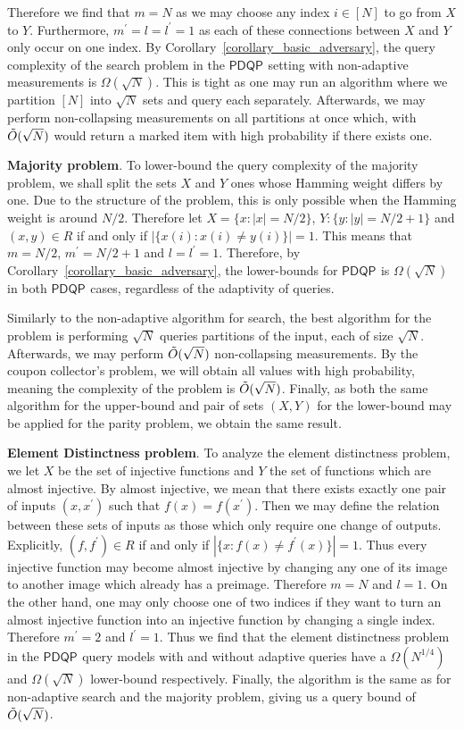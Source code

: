 \documentclass[10pt,a4paper]{article}
\newcommand{\compclass}[2][]{\ensuremath{\mathsf{#2}^{#1}}\xspace}
\newcommand{\pdqpname}[0]{\compclass{PDQP}}
\begin{document}
Therefore we find that $m=N$ as we may choose any index $i\in[N]$ to go from $X$ to $Y$. Furthermore, $m^\prime = l = l^\prime = 1$ as each of these connections between $X$ and $Y$ only occur on one index. By Corollary~\ref{corollary_basic_adversary}, the query complexity of the search problem in the \pdqpname setting with non-adaptive measurements is $\Omega(\sqrt{N})$. This is tight as one may run an algorithm where we partition $[N]$ into $\sqrt{N}$ sets and query each separately. Afterwards, we may perform non-collapsing measurements on all partitions at once which, with $\Tilde{O}(\sqrt{N})$ would return a marked item with high probability if there exists one.

\textbf{Majority problem}. To lower-bound the query complexity of the majority problem, we shall split the sets $X$ and $Y$ ones whose Hamming weight differs by one. Due to the structure of the problem, this is only possible when the Hamming weight is around $N/2$. Therefore let $X=\{x:|x|=N/2\}$, $Y: \{y: |y|=N/2+1\}$ and $(x,y)\in R$ if and only if $|\{x(i): x(i)\neq y(i)\}| = 1$. This means that $m=N/2$, $m^\prime=N/2+1$ and $l=l^\prime = 1$. Therefore, by Corollary~\ref{corollary_basic_adversary}, the lower-bounds for \pdqpname is $\Omega(\sqrt{N})$ in both \pdqpname cases, regardless of the adaptivity of queries. 

Similarly to the non-adaptive algorithm for search, the best algorithm for the problem is performing $\sqrt{N}$ queries partitions of the input, each of size $\sqrt{N}$. Afterwards, we may perform $\Tilde{O}(\sqrt{N})$ non-collapsing measurements. By the coupon collector's problem, we will obtain all values with high probability, meaning the complexity of the problem is $\Tilde{O}(\sqrt{N})$. Finally, as both the same algorithm for the upper-bound and pair of sets $(X,Y)$ for the lower-bound may be applied for the parity problem, we obtain the same result.

\textbf{Element Distinctness problem}. To analyze the element distinctness problem, we let $X$ be the set of injective functions and $Y$ the set of functions which are almost injective. By almost injective, we mean that there exists exactly one pair of inputs $(x,x^\prime)$ such that $f(x)=f(x^\prime)$. Then we may define the relation between these sets of inputs as those which only require one change of outputs. Explicitly, $(f,f^\prime)\in R$ if and only if $|\{x: f(x)\neq f^\prime(x)\}| = 1$. Thus every injective function may become almost injective by changing any one of its image to another image which already has a preimage. Therefore $m=N$ and $l=1$. On the other hand, one may only choose one of two indices if they want to turn an almost injective function into an injective function by changing a single index. Therefore $m^\prime = 2$ and $l^\prime = 1$. Thus we find that the element distinctness problem in the \pdqpname query models with and without adaptive queries have a $\Omega(N^{1/4})$ and $\Omega(\sqrt{N})$ lower-bound respectively. Finally, the algorithm is the same as for non-adaptive search and the majority problem, giving us a query bound of $\Tilde{O}(\sqrt{N})$.
\end{document}
